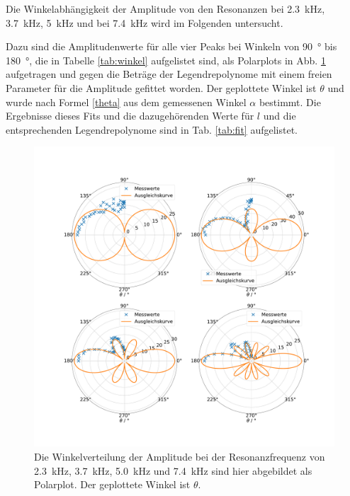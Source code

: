 Die Winkelabhängigkeit der Amplitude von den Resonanzen bei \SI{2.3}{\kilo\hertz}, \SI{3.7}{\kilo\hertz}, \SI{5}{\kilo\hertz} und bei \SI{7.4}{\kilo\hertz} wird im Folgenden untersucht. 

Dazu sind die Amplitudenwerte für alle vier Peaks bei Winkeln von \SI{90}{\degree} bis \SI{180}{\degree}, die in Tabelle \ref{tab:winkel} aufgelistet sind, als Polarplots in Abb. \ref{fig:polar23} aufgetragen und gegen die Beträge der Legendrepolynome mit einem freien Parameter für die Amplitude gefittet worden. Der geplottete Winkel ist $\theta$ und wurde nach Formel \eqref{theta} aus dem gemessenen Winkel $\alpha$ bestimmt.
Die Ergebnisse dieses Fits und die dazugehörenden Werte für $l$ und die entsprechenden Legendrepolynome sind in Tab. \ref{tab:fit} aufgelistet.

\begin{figure}
    \centering
    \includegraphics[width=\textwidth]{plots/C_polar1.pdf}
    \caption{Die Winkelverteilung der Amplitude bei der Resonanzfrequenz von \SI{2.3}{\kilo\hertz}, \SI{3.7}{\kilo\hertz}, \SI{5.0}{\kilo\hertz} und \SI{7.4}{\kilo\hertz} sind hier abgebildet als Polarplot. Der geplottete Winkel ist $\theta$.}
    \label{fig:polar23}
\end{figure}


